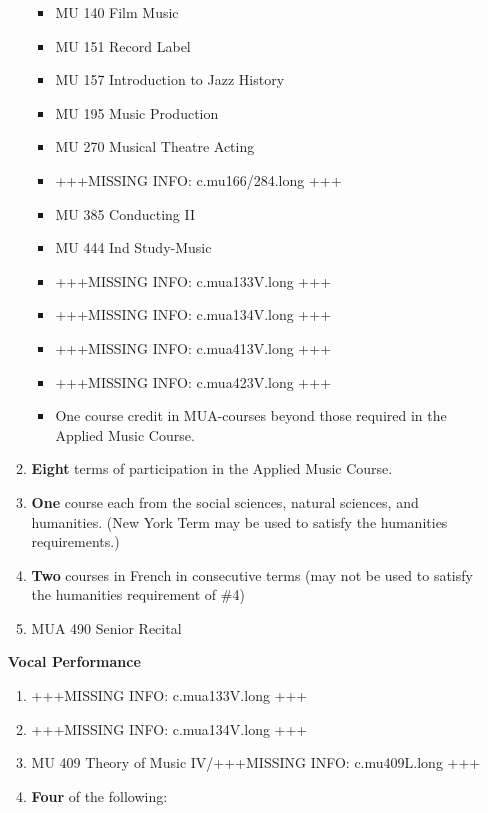 \documentclass[
  letterpaper,
]{scrbook}
\providecommand{\tightlist}{%
  \setlength{\itemsep}{0pt}\setlength{\parskip}{0pt}}
\begin{document}
\begin{enumerate}
\begin{enumerate}
    \begin{itemize}
    \tightlist
    \item
      MU 140 Film Music
    \item
      MU 151 Record Label
    \item
      MU 157 Introduction to Jazz History
    \item
      MU 195 Music Production
    \item
      MU 270 Musical Theatre Acting
    \item
      +++MISSING INFO: c.mu166/284.long +++
    \item
      MU 385 Conducting II
    \item
      MU 444 Ind Study-Music
    \item
      +++MISSING INFO: c.mua133V.long +++
    \item
      +++MISSING INFO: c.mua134V.long +++
    \item
      +++MISSING INFO: c.mua413V.long +++
    \item
      +++MISSING INFO: c.mua423V.long +++
    \item
      One course credit in MUA-courses beyond those required in the
      Applied Music Course.
    \end{itemize}
  \item
    \textbf{Eight} terms of participation in the Applied Music Course.
  \item
    \textbf{One} course each from the social sciences, natural sciences,
    and humanities. (New York Term may be used to satisfy the humanities
    requirements.)
  \item
    \textbf{Two} courses in French in consecutive terms (may not be used
    to satisfy the humanities requirement of \#4)
  \item
    MUA 490 Senior Recital
  \end{enumerate}

  \textbf{Vocal Performance}

  \begin{enumerate}
  \def\labelenumii{\arabic{enumii}.}
  \tightlist
  \item
    +++MISSING INFO: c.mua133V.long +++
  \item
    +++MISSING INFO: c.mua134V.long +++
  \item
    MU 409 Theory of Music IV/+++MISSING INFO: c.mu409L.long +++
  \item
    \textbf{Four} of the following:


\end{enumerate}
\end{enumerate}
\end{document}
